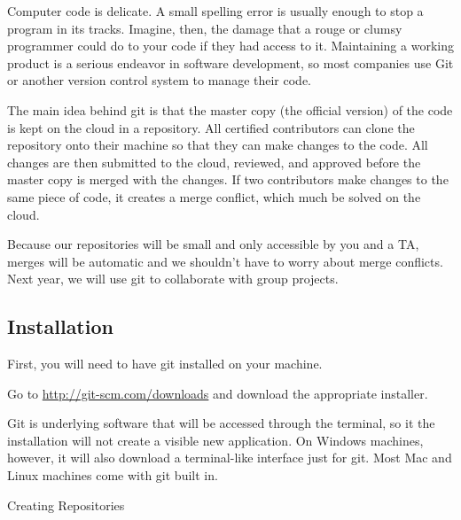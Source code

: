 \label{appendix:git}

Computer code is delicate.
A small spelling error is usually enough to stop a program in its tracks.
Imagine, then, the damage that a rouge or clumsy programmer could do to your code if they had access to it.
Maintaining a working product is a serious endeavor in software development, so most companies use Git or another version control system to manage their code.

The main idea behind git is that the master copy (the official version) of the code is kept on the cloud in a repository. All certified contributors can clone the repository onto their machine so that they can make changes to the code. All changes are then submitted to the cloud, reviewed, and approved before the master copy is merged with the changes. If two contributors make changes to the same piece of code, it creates a merge conflict, which much be solved on the cloud.

Because our repositories will be small and only accessible by you and a TA, merges will be automatic and we shouldn’t have to worry about merge conflicts. Next year, we will use git to collaborate with group projects.

\subsection*{Installation} %

First, you will need to have git installed on your machine.

Go to \url{http://git-scm.com/downloads} and download the appropriate installer.

Git is underlying software that will be accessed through the terminal, so it the installation will not create a visible new application. On Windows machines, however, it will also download a terminal-like interface just for git. Most Mac and Linux machines come with git built in.

Creating Repositories


